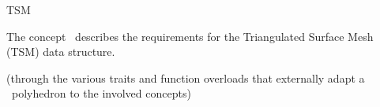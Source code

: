 
\begin{ccRefConcept}{TSM}


\ccDefinition

The concept \ccRefName\ describes the requirements for the Triangulated Surface Mesh (TSM) data structure.

\ccRefines
{}

\ccHasModels
{}
  (through the various traits and function overloads that externally adapt a \cgal\ polyhedron to the involved concepts)

\end{ccRefConcept}

